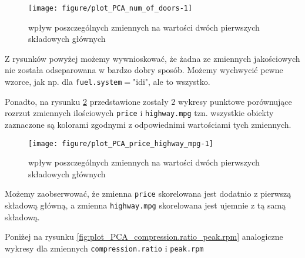 \documentclass[12pt, a4paper]{article}\usepackage[]{graphicx}\usepackage[]{xcolor}
\makeatletter
\def\maxwidth{ %
  \ifdim\Gin@nat@width>\linewidth
    \linewidth
  \else
    \Gin@nat@width
  \fi
}
\newenvironment{knitrout}{}{} %
\makeatother
\begin{document}
\begin{knitrout}
\color{fgcolor}\begin{figure}[H]

{\centering \texttt{[image: figure/plot\_PCA\_num\_of\_doors-1]} 

}

\caption[wpływ poszczególnych zmiennych na wartości dwóch pierwszych składowych głównych]{wpływ poszczególnych zmiennych na wartości dwóch pierwszych składowych głównych}\label{fig:plot_PCA_num.of.doors}
\end{figure}

\end{knitrout}
Z rysunków powyżej możemy wywnioskować, że żadna ze zmiennych jakościowych nie została odseparowana w bardzo dobry sposób. Możemy wychwycić pewne wzorce, jak np. dla \texttt{fuel.system}$=$"idi", ale to wszystko.

\par Ponadto, na rysunku \ref{fig:plot_PCA_price_highway.mpg} przedstawione zostały $2$ wykresy punktowe porównujące rozrzut zmiennych ilościowych \texttt{price} i \texttt{highway.mpg} tzn. wszystkie obiekty zaznaczone są kolorami zgodnymi z odpowiednimi wartościami tych zmiennych.


\begin{knitrout}
\color{fgcolor}\begin{figure}[H]

{\centering \texttt{[image: figure/plot\_PCA\_price\_highway\_mpg-1]} 

}

\caption[wpływ poszczególnych zmiennych na wartości dwóch pierwszych składowych głównych]{wpływ poszczególnych zmiennych na wartości dwóch pierwszych składowych głównych}\label{fig:plot_PCA_price_highway.mpg}
\end{figure}

\end{knitrout}
Możemy zaobserwować, że zmienna \texttt{price} skorelowana jest dodatnio z pierwszą składową główną, a zmienna \texttt{highway.mpg} skorelowana jest ujemnie z tą samą składową.


Poniżej na rysunku \ref{fig:plot_PCA_compression.ratio_peak.rpm} analogiczne wykresy dla zmiennych \texttt{compression.ratio} i \texttt{peak.rpm}
\end{document}
